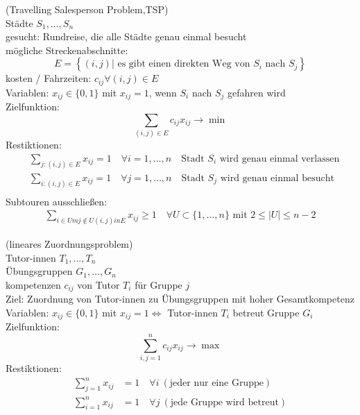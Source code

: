 \begin{beispiel}
(Travelling Salesperson Problem,TSP)\\
	Städte $S_{1},\dots, S_{n}$\\
	gesucht: Rundreise, die alle Städte genau einmal besucht\\
	mögliche Streckenabschnitte:
	\begin{equation*}
		E = \left \{  (i,j) | \text{ es gibt einen direkten Weg von $S_{i}$ nach $S_{j}$}  \right \}
	\end{equation*} 
	kosten / Fahrzeiten: $c_{ij} \forall (i,j) \in E$\\
	Variablen: $x_{ij} \in \{0,1\}$ mit $x_{ij}=1$, wenn $S_{i}$ nach $S_j$ gefahren wird\\
	Zielfunktion: 
	\begin{equation*}
		\sum_{(i,j)\in E}  c_{ij}x_{ij} \rightarrow \min
	\end{equation*} 
	Restiktionen:
	\begin{align*}
		&\sum_{j:(i,j)\in E} x_{ij}=1 \quad \forall i = 1,\dots,n\quad \text{Stadt $S_{i}$ wird genau einmal verlassen}\\
		&\sum_{i:(i,j)\in E} x_{ij}=1 \quad \forall j = 1,\dots,n \quad\text{Stadt $S_{j}$ wird genau einmal besucht}\\
	\end{align*} 
	Subtouren ausschließen:
	\begin{align*}
		\sum_{i\in Um j \not\in U (i,j) in E} x_{ij} \geq 1 \quad \forall U \subset \{1,\dots,n\} \text{ mit }2\leq |U|\leq n-2
	\end{align*} 
\end{beispiel} 

\begin{beispiel}
	(lineares Zuordnungsproblem)\\
	Tutor-innen $T_{1},\dots,T_{n}$ \\
	Übungsgruppen $G_{1},\dots, G_{n}$ \\
	kompetenzen $c_{ij}$ von Tutor $T_{i}$ für Gruppe $j$\\
	Ziel: Zuordnung von Tutor-innen zu Übungsgruppen mit hoher Gesamtkompetenz\\
	Variablen: $x_{ij}\in \{0,1\}$ mit $x_{ij}=1 \iff$ Tutor-innen $T_{i}$ betreut Gruppe $G_{i}$ \\
	Zielfunktion: 
	\begin{equation*}
		\sum_{i,j=1}^{n}  c_{ij}x_{ij} \rightarrow \max 
	\end{equation*} 
	Restiktionen: 
	\begin{align*}
		\sum_{j=1}^{n} x_{ij} &= 1\quad \forall i\ (\text{jeder nur eine Gruppe})\\
		\sum_{i=1}^{n} x_{ij} &= 1\quad \forall j\ (\text{jede Gruppe wird betreut})
	\end{align*} 
\end{beispiel} 


